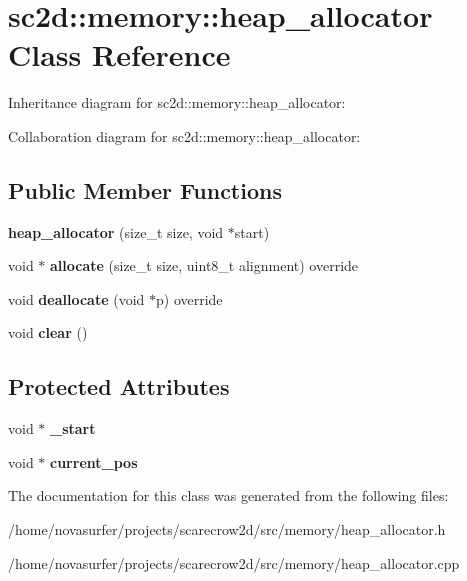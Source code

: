 \hypertarget{classsc2d_1_1memory_1_1heap__allocator}{}\section{sc2d\+:\+:memory\+:\+:heap\+\_\+allocator Class Reference}
\label{classsc2d_1_1memory_1_1heap__allocator}


Inheritance diagram for sc2d\+:\+:memory\+:\+:heap\+\_\+allocator\+:


Collaboration diagram for sc2d\+:\+:memory\+:\+:heap\+\_\+allocator\+:
\subsection*{Public Member Functions}
\begin{DoxyCompactItemize}
\item 
\mbox{\label{classsc2d_1_1memory_1_1heap__allocator_a0fa3d59366842074cb177867c37b00ec}} 
{\bfseries heap\+\_\+allocator} (size\+\_\+t size, void $\ast$start)
\item 
\mbox{\label{classsc2d_1_1memory_1_1heap__allocator_a1441e163b0489a7f3815e8efe7f3ed27}} 
void $\ast$ {\bfseries allocate} (size\+\_\+t size, uint8\+\_\+t alignment) override
\item 
\mbox{\label{classsc2d_1_1memory_1_1heap__allocator_a987dfa94a8b7e1e2b38369d5d25b2ede}} 
void {\bfseries deallocate} (void $\ast$p) override
\item 
\mbox{\label{classsc2d_1_1memory_1_1heap__allocator_ad35c2947bd17e097fc7cf67481704593}} 
void {\bfseries clear} ()
\end{DoxyCompactItemize}
\subsection*{Protected Attributes}
\begin{DoxyCompactItemize}
\item 
\mbox{\label{classsc2d_1_1memory_1_1heap__allocator_a8fdf52a547f5b711fa1c98ef944482a2}} 
void $\ast$ {\bfseries \+\_\+start}
\item 
\mbox{\label{classsc2d_1_1memory_1_1heap__allocator_a503f6d6e39bffe6d6d7d4abb92f1c1c7}} 
void $\ast$ {\bfseries current\+\_\+pos}
\end{DoxyCompactItemize}


The documentation for this class was generated from the following files\+:\begin{DoxyCompactItemize}
\item 
/home/novasurfer/projects/scarecrow2d/src/memory/heap\+\_\+allocator.\+h\item 
/home/novasurfer/projects/scarecrow2d/src/memory/heap\+\_\+allocator.\+cpp\end{DoxyCompactItemize}
